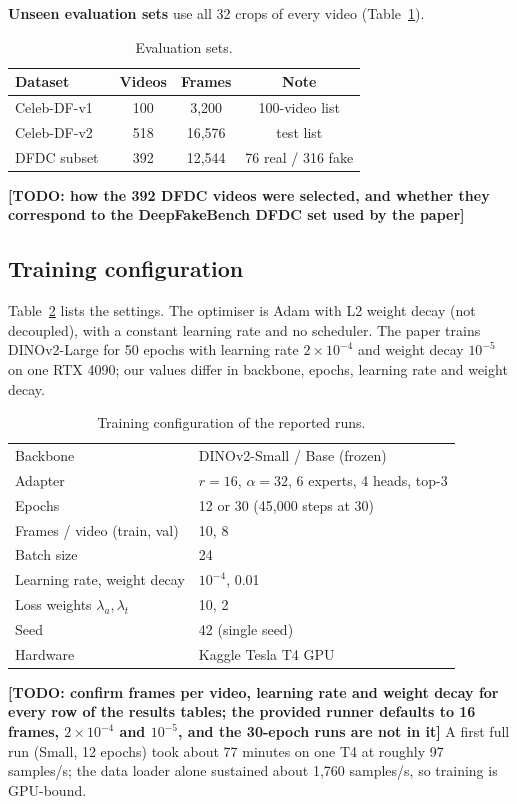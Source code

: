 \documentclass[lettersize,journal]{IEEEtran}
\newcommand{\todo}[1]{\textbf{[TODO: #1]}}
\begin{document}
\textbf{Unseen evaluation sets} use all 32 crops of every video (Table~\ref{tab:data}).
\begin{table}[!t]
\caption{Evaluation sets.\label{tab:data}}
\centering
\footnotesize
\begin{tabular}{|l||c|c|c|}
\hline
Dataset & Videos & Frames & Note\\
\hline
Celeb-DF-v1~\cite{li2020celebdf} & 100 & 3{,}200 & 100-video list\\
Celeb-DF-v2~\cite{li2020celebdf} & 518 & 16{,}576 & test list\\
DFDC subset~\cite{dolhansky2020dfdc} & 392 & 12{,}544 & 76 real / 316 fake\\
\hline
\end{tabular}
\end{table}
\todo{how the 392 DFDC videos were selected, and whether they correspond to the DeepFakeBench DFDC set used by the paper}

\subsection{Training configuration}
Table~\ref{tab:cfg} lists the settings. The optimiser is Adam with L2 weight decay (not decoupled), with a constant learning rate and no scheduler. The paper trains DINOv2-Large for 50 epochs with learning rate $2\times10^{-4}$ and weight decay $10^{-5}$ on one RTX 4090; our values differ in backbone, epochs, learning rate and weight decay.
\begin{table}[!t]
\caption{Training configuration of the reported runs.\label{tab:cfg}}
\centering
\footnotesize
\begin{tabular}{|l||l|}
\hline
Backbone & DINOv2-Small / Base (frozen)\\
Adapter & $r{=}16$, $\alpha{=}32$, 6 experts, 4 heads, top-3\\
Epochs & 12 or 30 (45{,}000 steps at 30)\\
Frames / video (train, val) & 10, 8\\
Batch size & 24\\
Learning rate, weight decay & $10^{-4}$, 0.01\\
Loss weights $\lambda_a,\lambda_t$ & 10, 2\\
Seed & 42 (single seed)\\
Hardware & Kaggle Tesla T4 GPU\\
\hline
\end{tabular}
\end{table}
\todo{confirm frames per video, learning rate and weight decay for every row of the results tables; the provided runner defaults to 16 frames, $2\times10^{-4}$ and $10^{-5}$, and the 30-epoch runs are not in it} A first full run (Small, 12 epochs) took about 77 minutes on one T4 at roughly 97 samples/s; the data loader alone sustained about 1{,}760 samples/s, so training is GPU-bound.
\end{document}
